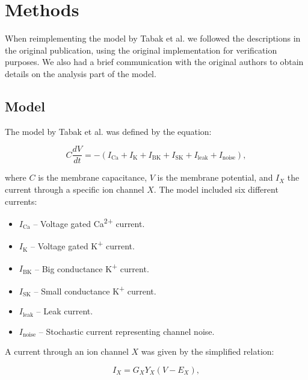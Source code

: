 \documentclass[10pt,a4paper,onecolumn]{article}
\newcommand{\tightlist}{%
  \setlength{\itemsep}{1pt}\setlength{\parskip}{0pt}\setlength{\parsep}{0pt}}
\begin{document}
\section{Methods}\label{methods}

When reimplementing the model by Tabak et al. \autocite{tabak2011} we
followed the descriptions in the original publication, using the
original implementation for verification purposes. We also had a brief
communication with the original authors to obtain details on the
analysis part of the model.

\subsection{Model}\label{model}

The model by Tabak et al. \autocite{tabak2011} was defined by the
equation:

\begin{equation}C \frac{dV}{dt} = - (I_{\mathrm{Ca}} + I_{\mathrm{K}} + I_{\mathrm{BK}} + I_{\mathrm{SK}} + I_{\mathrm{leak}} + I_{\mathrm{noise}} ),\label{eq:V}\end{equation}

\noindent
where \(C\) is the membrane capacitance, \(V\) is the membrane
potential, and \(I_X\) the current through a specific ion channel \(X\).
The model included six different currents:

\begin{itemize}
\tightlist
\item
  \(I_{\mathrm{Ca}}\) -- Voltage gated Ca\textsuperscript{2+} current.
\item
  \(I_{\mathrm{K}}\) -- Voltage gated K\textsuperscript{+} current.
\item
  \(I_{\mathrm{BK}}\) -- Big conductance K\textsuperscript{+} current.
\item
  \(I_{\mathrm{SK}}\) -- Small conductance K\textsuperscript{+} current.
\item
  \(I_{\mathrm{leak}}\) -- Leak current.
\item
  \(I_{\mathrm{noise}}\) -- Stochastic current representing channel
  noise.
\end{itemize}

\noindent
A current through an ion channel \(X\) was given by the simplified
relation:

\begin{equation}I_{X} = G_{X}Y_X(V - E_{X}),\label{eq:I}\end{equation}
\end{document}
